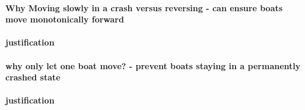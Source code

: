         \paragraph{Why Moving slowly in a crash versus reversing - can ensure boats move monotonically forward}
        \paragraph{justification}
        \paragraph{why only let one boat move? - prevent boats staying in a permanently crashed state}
        \paragraph{justification}
  

